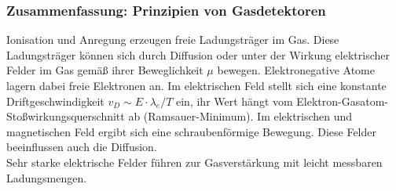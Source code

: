 \subsubsection*{Zusammenfassung: Prinzipien von Gasdetektoren}

Ionisation und Anregung erzeugen freie Ladungsträger im Gas. Diese Ladungsträger können sich durch
Diffusion oder unter der Wirkung elektrischer Felder im Gas gemäß ihrer Beweglichkeit $\mu$
bewegen. Elektronegative Atome lagern dabei freie Elektronen an. Im elektrischen Feld stellt sich
eine konstante Driftgeschwindigkeit $v_D\sim E\cdot\lambda_e/T$ ein, ihr Wert hängt vom
Elektron-Gasatom-Stoßwirkungsquerschnitt ab (Ramsauer-Minimum). Im elektrischen und magnetischen
Feld ergibt sich eine schraubenförmige Bewegung. Diese Felder beeinflussen auch die Diffusion.
\\
Sehr starke elektrische Felder führen zur Gasverstärkung mit leicht messbaren Ladungsmengen.
